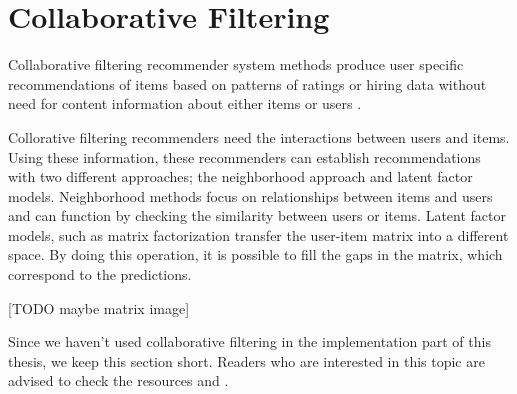
\section{Collaborative Filtering}\label{section:collaborative_filtering}

Collaborative filtering recommender system methods produce user specific recommendations of items based on patterns of ratings or hiring data without need for content information about either items or users \cite{desrosiers2011comprehensive}.

Collorative filtering recommenders need the interactions between users and items. Using these information, these recommenders can establish recommendations with two different approaches; 
the neighborhood approach and latent factor models. Neighborhood methods focus on relationships between items and users and can function by checking the similarity between users or items.  Latent factor models, such as matrix factorization transfer the user-item matrix into a different space. By doing this operation, it is possible to fill the gaps in the matrix, which correspond to the predictions.

[TODO maybe matrix image]

Since we haven't used collaborative filtering in the implementation part of this thesis, we keep this section short. Readers who are interested in this topic are advised to check the resources \cite{koren2015advances} and \cite{wang2015collaborative}.
